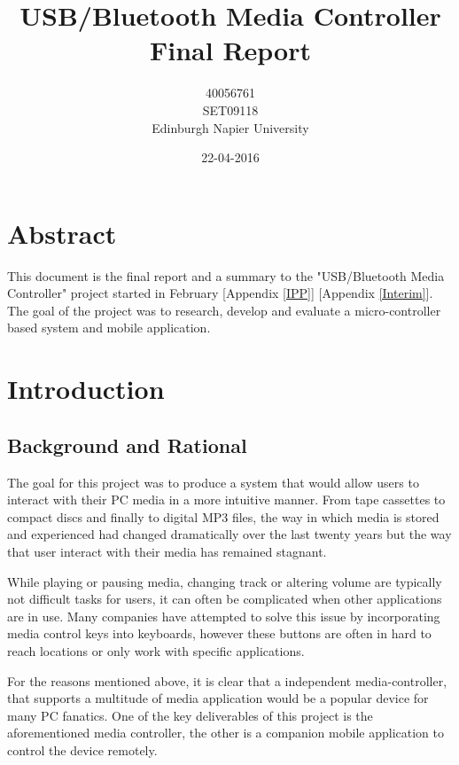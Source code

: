 \documentclass{article}
\title{USB/Bluetooth Media Controller\\Final Report}
\author{40056761\\SET09118\\Edinburgh Napier University}
\date{22-04-2016}
\begin{document}
		
	\maketitle
	
	\section*{Abstract}	
		This document is the final report and a summary to the "USB/Bluetooth Media Controller" project started in February [Appendix \ref{IPP}] [Appendix \ref{Interim}]. The goal of the project was to research, develop and evaluate a micro-controller based system and mobile application.		
				
	\newpage
		
		
	\tableofcontents
	
	\listoffigures
	
	\listoftables
	
	\lstlistoflistings
		
	\newpage
		
	\section{Introduction}
		\subsection{Background and Rational}
			The goal for this project was to produce a system that would allow users to interact with their PC media in a more intuitive manner. From tape cassettes to compact discs and finally to digital MP3 files, the way in which media is stored and experienced had changed dramatically over the last twenty years but the way that user interact with their media has remained stagnant.
			
			While playing or pausing media, changing track or altering volume are typically not difficult tasks for users, it can often be complicated when other applications are in use. Many companies have attempted to solve this issue by incorporating media control keys into keyboards, however these buttons are often in hard to reach locations or only work with specific applications.
			
			For the reasons mentioned above, it is clear that a independent media-controller, that supports a multitude of media application would be a popular device for many PC fanatics. One of the key deliverables of this project is the aforementioned media controller, the other is a companion mobile application to control the device remotely.
					
\end{document}
